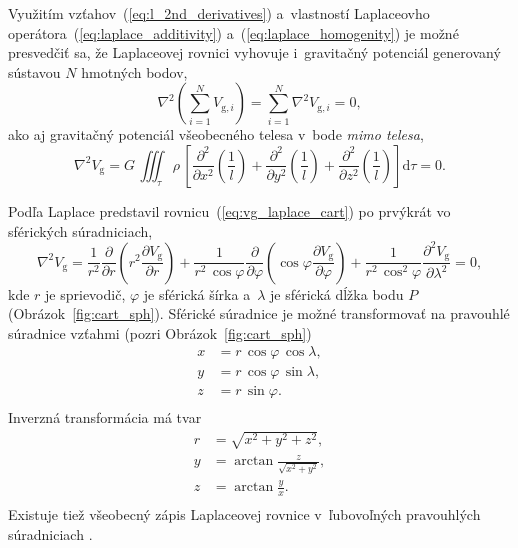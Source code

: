 \documentclass[a4paper, 12pt]{book}
\newcommand{\diff}{\mathrm d}
\newcommand{\gidx}{\mathrm g}
\begin{document}
Využitím vzťahov~(\ref{eq:l_2nd_derivatives}) a~vlastností Laplaceovho
operátora~(\ref{eq:laplace_additivity}) a~(\ref{eq:laplace_homogenity}) je
možné presvedčiť sa, že Laplaceovej rovnici vyhovuje i~gravitačný potenciál
generovaný sústavou $N$ hmotných bodov,
%
\begin{equation}
\nabla^2 \left( \sum_{i = 1}^N V_{\gidx,i} \right) = \sum_{i = 1}^N \nabla^2
V_{\gidx,i} = 0{,}
\end{equation}
%
ako aj gravitačný potenciál všeobecného telesa v~bode \emph{mimo telesa},
%
\begin{equation}
\nabla^2 V_\gidx = G\, \iiint_\tau \rho \, \left[ \frac{\partial^2}{\partial
x^2}\left(\frac{1}{l}\right) + \frac{\partial^2}{\partial
y^2}\left(\frac{1}{l}\right) + \frac{\partial^2}{\partial
z^2}\left(\frac{1}{l}\right) \right] \diff\tau = 0{.}
\end{equation}

Podľa \cite{MacMillan1930} Laplace predstavil
rovnicu~(\ref{eq:vg_laplace_cart}) po prvýkrát vo sférických súradniciach,
%
\begin{equation}
\label{eq:vg_laplace_sph}
\nabla^2 V_\gidx = \frac{1}{r^2} \frac{\partial}{\partial r} \left( r^2
\frac{\partial V_\gidx}{\partial r} \right) + \frac{1}{r^2 \, \cos\varphi}
\frac{\partial}{\partial \varphi} \left( \cos\varphi \frac{\partial
V_\gidx}{\partial \varphi} \right) + \frac{1}{r^2 \,
\cos^2\varphi}\frac{\partial^2 V_\gidx}{\partial \lambda^2} = 0{,}
\end{equation}
%
kde $r$ je sprievodič, $\varphi$ je sférická šírka a~$\lambda$ je sférická
dĺžka bodu $P$ (Obrázok~\ref{fig:cart_sph}).  Sférické súradnice je možné
transformovať na pravouhlé súradnice vzťahmi (pozri Obrázok~\ref{fig:cart_sph})
%
\begin{equation}
\label{eq:sph2cart}
\begin{split}
x &= r \, \cos\varphi \, \cos\lambda{,}\\
y &= r \, \cos\varphi \, \sin\lambda{,}\\
z &= r \, \sin\varphi{.}\\
\end{split}
\end{equation}
%
Inverzná transformácia má tvar
%
\begin{equation}
\label{eq:cart2sph}
\begin{split}
r &= \sqrt{x^2 + y^2 + z^2}{,}\\
y &= \arctan \frac{z}{\sqrt{x^2 + y^2}}{,}\\
z &= \arctan \frac{y}{x}{.}\\
\end{split}
\end{equation}
%
Existuje tiež všeobecný zápis Laplaceovej rovnice v~ľubovoľných pravouhlých
súradniciach \citep[pozri napríklad][]{MoritzPhysicalGeodesy}.
\end{document}
